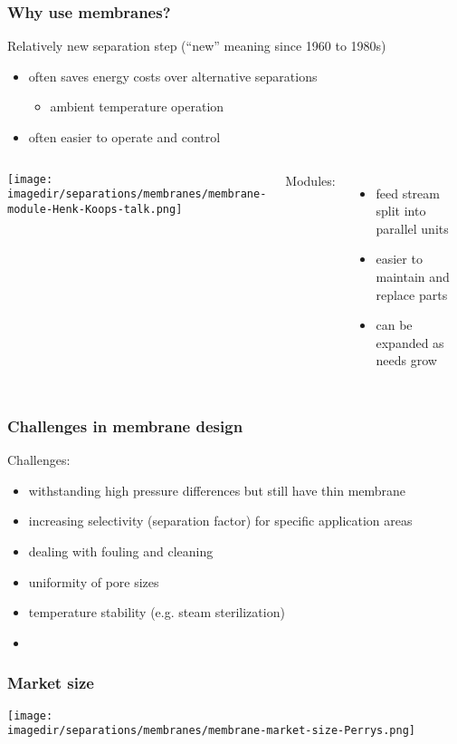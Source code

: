 \begin{frame}\frametitle{Why use membranes?}
	Relatively new separation step {\small (``new'' meaning since 1960 to 1980s)}
	\begin{itemize}
		\item	often saves energy costs over alternative separations
		\begin{itemize}
			\item	ambient temperature operation
		\end{itemize}
		\item	often easier to operate and control
	\end{itemize}
	
	
	\begin{columns}[c]
			\begin{center}
				\texttt{[image: \\imagedir/separations/membranes/membrane-module-Henk-Koops-talk.png]}
			\end{center}
			Modules:
			\begin{itemize}
				\item	feed stream split into parallel units
				\item	easier to maintain and replace parts
				\item	can be expanded as needs grow
			\end{itemize}			
	\end{columns}
\end{frame}

\begin{frame}\frametitle{Challenges in membrane design}
	Challenges:
	\begin{itemize}
		\item	withstanding high pressure differences but still have thin membrane
		\item	increasing selectivity (separation factor) for specific application areas
		\item	dealing with fouling and cleaning
		\item	uniformity of pore sizes
		\item	temperature stability (e.g. steam sterilization)
		\item	
	\end{itemize}
\end{frame}

\begin{frame}\frametitle{Market size}
	\begin{center}
		\texttt{[image: \\imagedir/separations/membranes/membrane-market-size-Perrys.png]}
	\end{center}
\end{frame}

